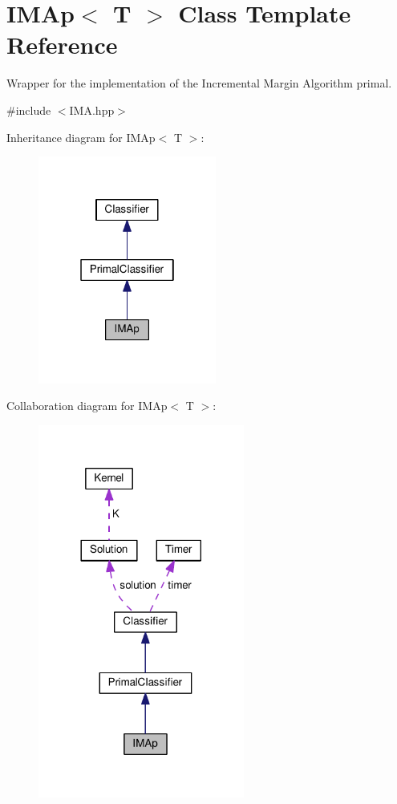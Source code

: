 \hypertarget{class_i_m_ap}{}\section{I\+M\+Ap$<$ T $>$ Class Template Reference}
\label{class_i_m_ap}


Wrapper for the implementation of the Incremental Margin Algorithm primal.  




{\ttfamily \#include $<$I\+M\+A.\+hpp$>$}



Inheritance diagram for I\+M\+Ap$<$ T $>$\+:\nopagebreak
\begin{figure}[H]
\begin{center}
\leavevmode
\includegraphics[width=166pt]{class_i_m_ap__inherit__graph}
\end{center}
\end{figure}


Collaboration diagram for I\+M\+Ap$<$ T $>$\+:\nopagebreak
\begin{figure}[H]
\begin{center}
\leavevmode
\includegraphics[width=192pt]{class_i_m_ap__coll__graph}
\end{center}
\end{figure}
